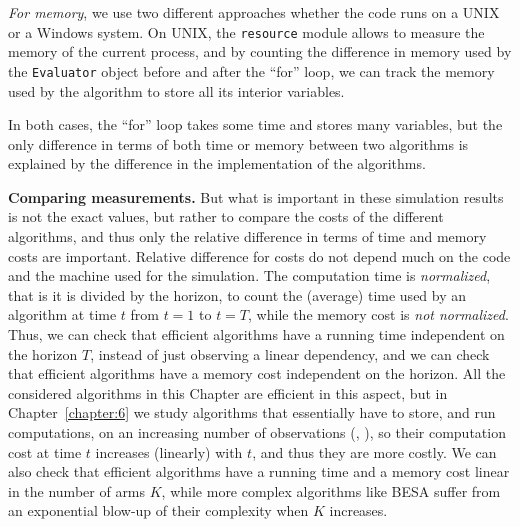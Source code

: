     \emph{For memory}, we use two different approaches whether the code runs on a UNIX or a Windows system.
    On UNIX, the \texttt{resource} module allows to measure the memory of the current process, and by counting the difference in memory used by the \texttt{Evaluator} object before and after the ``for'' loop, we can track the memory used by the algorithm to store all its interior variables.

In both cases, the ``for'' loop takes some time and stores many variables, but the only difference in terms of both time or memory between two algorithms is explained by the difference in the implementation of the algorithms.



\textbf{Comparing measurements.}
%
But what is important in these simulation results is not the exact values, but rather to compare the costs of the different algorithms, and thus only the relative difference in terms of time and memory costs are important.
Relative difference for costs do not depend much on the code and the machine used for the simulation.
%
The computation time is \emph{normalized}, that is it is divided by the horizon, to count the (average) time used by an algorithm at time $t$ from $t=1$ to $t=T$, while the memory cost is \emph{not normalized}.
%
Thus, we can check that efficient algorithms have a running time independent on the horizon $T$, instead of just observing a linear dependency, and we can check that efficient algorithms have a memory cost independent on the horizon.
All the considered algorithms in this Chapter are efficient in this aspect, but in Chapter~\ref{chapter:6} we study algorithms that essentially have to store, and run computations, on an increasing number of observations (\eg, \CUSUMUCB), so their computation cost at time $t$ increases (linearly) with $t$, and thus they are more costly.
%
We can also check that efficient algorithms have a running time and a memory cost linear in the number of arms $K$, while more complex algorithms like BESA suffer from an exponential blow-up of their complexity when $K$ increases.


